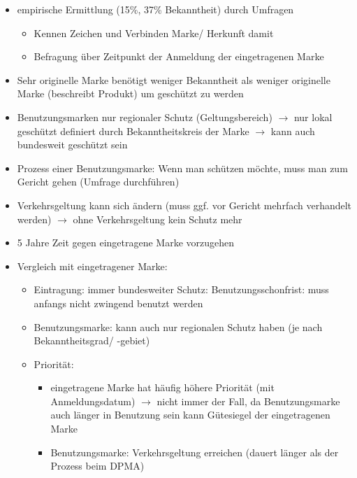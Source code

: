 \documentclass{report}
\begin{document}
\begin{itemize}
\begin{itemize}
		\item empirische Ermittlung (15\%, 37\% Bekanntheit) durch Umfragen
		\begin{itemize}
			\item Kennen Zeichen und Verbinden Marke/ Herkunft damit
			\item Befragung über Zeitpunkt der Anmeldung der eingetragenen Marke
		\end{itemize}
		\item Sehr originelle Marke benötigt weniger Bekanntheit als weniger originelle Marke (beschreibt Produkt) um geschützt zu werden
		\item Benutzungsmarken nur regionaler Schutz (Geltungsbereich) $\rightarrow$ nur lokal geschützt
		\newline definiert durch Bekanntheitskreis der Marke $\rightarrow$ kann auch bundesweit geschützt sein
		\item Prozess einer Benutzungsmarke:
		\newline Wenn man schützen möchte, muss man zum Gericht gehen (Umfrage durchführen)
		\item Verkehrsgeltung kann sich ändern (muss ggf. vor Gericht mehrfach verhandelt werden) $\rightarrow$ ohne Verkehrsgeltung kein Schutz mehr
		\item 5 Jahre Zeit gegen eingetragene Marke vorzugehen
		\item Vergleich mit eingetragener Marke:
		\begin{itemize}
			\item Eintragung: immer bundesweiter Schutz:
			\newline Benutzungsschonfrist: muss anfangs nicht zwingend benutzt werden
			\item Benutzungsmarke: kann auch nur regionalen Schutz haben (je nach Bekanntheitsgrad/ -gebiet)
			\item Priorität:
			\begin{itemize}
				\item eingetragene Marke hat häufig höhere Priorität (mit Anmeldungsdatum)
				\newline $\rightarrow$ nicht immer der Fall, da Benutzungsmarke auch länger in Benutzung sein kann
				\newline Gütesiegel der eingetragenen Marke
				\item Benutzungsmarke: Verkehrsgeltung erreichen (dauert länger als der Prozess beim DPMA)
			\end{itemize}
		\end{itemize}
	\end{itemize}

\end{itemize}
\end{document}
